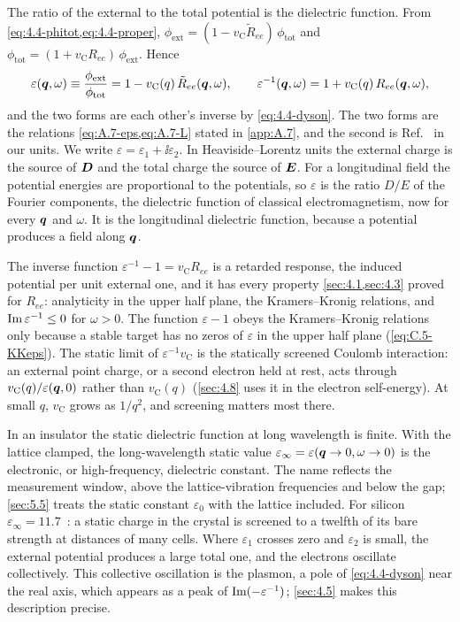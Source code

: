 The ratio of the external to the total potential is the dielectric function. From \cref{eq:4.4-phitot,eq:4.4-proper}, $\phi_{\mathrm{ext}} = (1 - v_{\mathrm{C}}\tilde R_{ee})\,\phi_{\mathrm{tot}}$ and $\phi_{\mathrm{tot}} = (1 + v_{\mathrm{C}}R_{ee})\,\phi_{\mathrm{ext}}$. Hence
\begin{equation}
  \varepsilon(\bm{q},\omega) \equiv \frac{\phi_{\mathrm{ext}}}{\phi_{\mathrm{tot}}} = 1 - v_{\mathrm{C}}(q)\,\tilde R_{ee}(\bm{q},\omega), \qquad
  \varepsilon^{-1}(\bm{q},\omega) = 1 + v_{\mathrm{C}}(q)\,R_{ee}(\bm{q},\omega) ,
  \label{eq:4.4-eps}
\end{equation}
and the two forms are each other's inverse by \cref{eq:4.4-dyson}. The two forms are the relations \cref{eq:A.7-eps,eq:A.7-L} stated in \cref{app:A.7}, and the second is Ref.~\cite[Eq.~(5)]{knapen2021dark} in our units. We write $\varepsilon = \varepsilon_1 + \ii\varepsilon_2$. In Heaviside--Lorentz units the external charge is the source of $\bm{D}$ and the total charge the source of $\bm{E}$. For a longitudinal field the potential energies are proportional to the potentials, so $\varepsilon$ is the ratio $D/E$ of the Fourier components, the dielectric function of classical electromagnetism, now for every $\bm{q}$ and $\omega$. It is the longitudinal dielectric function, because a potential produces a field along $\bm{q}$.

The inverse function $\varepsilon^{-1} - 1 = v_{\mathrm{C}}R_{ee}$ is a retarded response, the induced potential per unit external one, and it has every property \cref{sec:4.1,sec:4.3} proved for $R_{ee}$: analyticity in the upper half plane, the Kramers--Kronig relations, and $\operatorname{Im}\varepsilon^{-1} \le 0$ for $\omega > 0$. The function $\varepsilon - 1$ obeys the Kramers--Kronig relations only because a stable target has no zeros of $\varepsilon$ in the upper half plane (\cref{eq:C.5-KKeps}). The static limit of $\varepsilon^{-1}v_{\mathrm{C}}$ is the statically screened Coulomb interaction: an external point charge, or a second electron held at rest, acts through $v_{\mathrm{C}}(q)/\varepsilon(\bm{q},0)$ rather than $v_{\mathrm{C}}(q)$ (\cref{sec:4.8} uses it in the electron self-energy). At small $q$, $v_{\mathrm{C}}$ grows as $1/q^2$, and screening matters most there.

In an insulator the static dielectric function at long wavelength is finite. With the lattice clamped, the long-wavelength static value $\varepsilon_\infty = \varepsilon(\bm{q}\to0, \omega\to0)$ is the electronic, or high-frequency, dielectric constant. The name reflects the measurement window, above the lattice-vibration frequencies and below the gap; \cref{sec:5.5} treats the static constant $\varepsilon_0$ with the lattice included. For silicon $\varepsilon_\infty = 11.7$~\cite{franta2017temperature}: a static charge in the crystal is screened to a twelfth of its bare strength at distances of many cells. Where $\varepsilon_1$ crosses zero and $\varepsilon_2$ is small, the external potential produces a large total one, and the electrons oscillate collectively. This collective oscillation is the plasmon, a pole of \cref{eq:4.4-dyson} near the real axis, which appears as a peak of $\operatorname{Im}(-\varepsilon^{-1})$; \cref{sec:4.5} makes this description precise.

